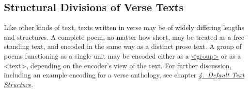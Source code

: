 \subsection[{Structural Divisions of Verse Texts}]{Structural Divisions of Verse Texts}\label{VEST}\par
Like other kinds of text, texts written in verse may be of widely differing lengths and structures. A complete poem, no matter how short, may be treated as a free-standing text, and encoded in the same way as a distinct prose text. A group of poems functioning as a single unit may be encoded either as a \hyperref[TEI.group]{<group>} or as a \hyperref[TEI.text]{<text>}, depending on the encoder's view of the text. For further discussion, including an example encoding for a verse anthology, see chapter \textit{\hyperref[DS]{4.\ Default Text Structure}}.\par
